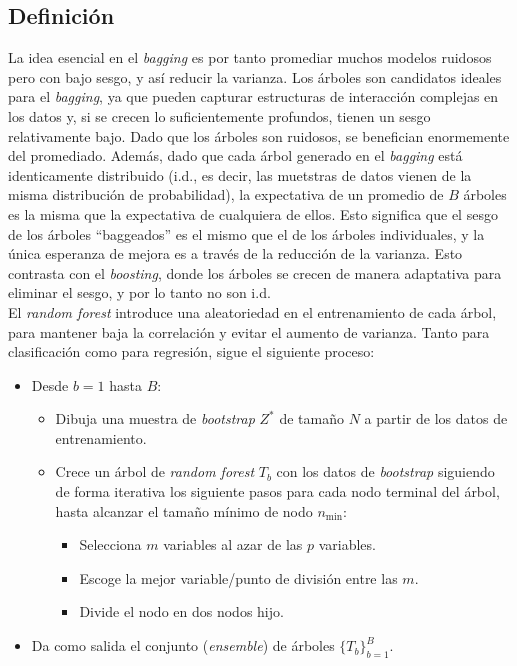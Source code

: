 \subsection{Definición}

La idea esencial en el \textit{bagging} es por tanto promediar muchos modelos ruidosos pero con bajo sesgo, y así reducir la varianza. Los árboles son candidatos ideales para el \textit{bagging}, ya que pueden capturar estructuras de interacción complejas en los datos y, si se crecen lo suficientemente profundos, tienen un sesgo relativamente bajo. Dado que los árboles son ruidosos, se benefician enormemente del promediado. Además, dado que cada árbol generado en el \textit{bagging} está identicamente distribuido (i.d., es decir, las muetstras de datos vienen de la misma distribución de probabilidad), la expectativa de un promedio de $B$ árboles es la misma que la expectativa de cualquiera de ellos. Esto significa que el sesgo de los árboles ``baggeados'' es el mismo que el de los árboles individuales, y la única esperanza de mejora es a través de la reducción de la varianza. Esto contrasta con el \textit{boosting}, donde los árboles se crecen de manera adaptativa para eliminar el sesgo, y por lo tanto no son i.d. \\

\noindent El \textit{random forest} introduce una aleatoriedad en el entrenamiento de cada árbol, para mantener baja la correlación y evitar el aumento de varianza. Tanto para clasificación como para regresión, sigue el siguiente proceso:
\begin{itemize}
\item Desde $b = 1$ hasta $B$:
\begin{itemize}
\item Dibuja una muestra de \textit{bootstrap} $Z^*$ de tamaño $N$ a partir de los datos de entrenamiento.
\item Crece un árbol de \textit{random forest} $T_b$ con los datos de \textit{bootstrap} siguiendo de forma iterativa los siguiente pasos para cada nodo terminal del árbol, hasta alcanzar el tamaño mínimo de nodo $n_{\text{min}}$:
\begin{itemize}
\item Selecciona $m$ variables al azar de las $p$ variables.
\item Escoge la mejor variable/punto de división entre las $m$.
\item Divide el nodo en dos nodos hijo.
\end{itemize}
\end{itemize}
\item Da como salida el conjunto (\textit{ensemble}) de árboles $\{T_b\}_{b=1}^B$.
\end{itemize}

